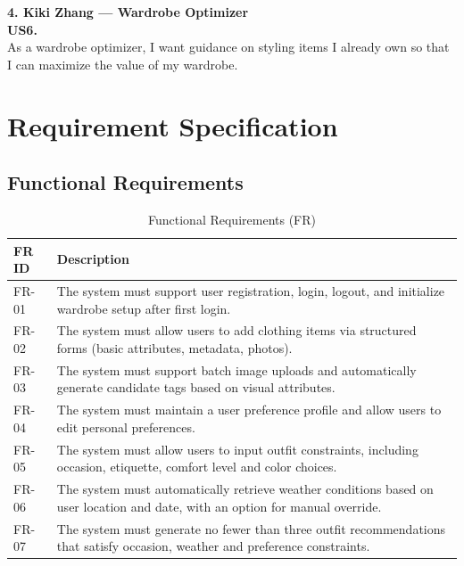 \textbf{\large 4. Kiki Zhang — Wardrobe Optimizer}\\

\textbf{US6.}\\
As a wardrobe optimizer, I want guidance on styling items I already own so that I can maximize the value of my wardrobe.

\section{Requirement Specification}
\subsection{Functional Requirements}
\begin{table}[ht]
\centering
\small
\caption{Functional Requirements (FR)}
\label{tab:functional_requirements}
\begin{tabular}{p{1.6cm}p{13.2cm}}
    \toprule
    \textbf{FR ID} & \textbf{Description} \\
    \midrule
    FR-01 &
    The system must support user registration, login, logout, and initialize wardrobe setup after first login. \\
    
    FR-02 &
    The system must allow users to add clothing items via structured forms (basic attributes, metadata, photos). \\
    
    FR-03 &
    The system must support batch image uploads and automatically generate candidate tags based on visual attributes. \\
    
    FR-04 &
    The system must maintain a user preference profile and allow users to edit personal preferences. \\
    
    FR-05 &
    The system must allow users to input outfit constraints, including occasion, etiquette, comfort level and color choices. \\
    
    FR-06 &
    The system must automatically retrieve weather conditions based on user location and date, with an option for manual override. \\
    
    FR-07 &
    The system must generate no fewer than three outfit recommendations that satisfy occasion, weather and preference constraints. \\
    

\end{tabular}
\end{table}
